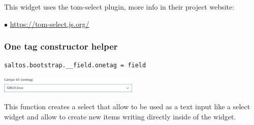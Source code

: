 \documentclass[a4paper]{article}
\def\htmladdnormallink#1#2{\href{#2}{#1}}
\begin{document}
This widget uses the tom-select plugin, more info in their project website:

\begin{compactitem}
\item[\color{myblue}$\bullet$] \htmladdnormallink{https://tom-select.js.org/}{https://tom-select.js.org/}
\end{compactitem}

\hypertarget{toc80}{}
\subsubsection{One tag constructor helper}

\begin{lstlisting}
saltos.bootstrap.__field.onetag = field
\end{lstlisting}

\begin{center}\includegraphics[width=0.5\textwidth]{../ujest/snaps/test-bootstrap-js-bootstrap-campo-45-onetag-1-snap.png}\end{center}

This function creates a select that allow to be used as a text input like a select widget and allow
to create new items writing directly inside of the widget.
\end{document}
